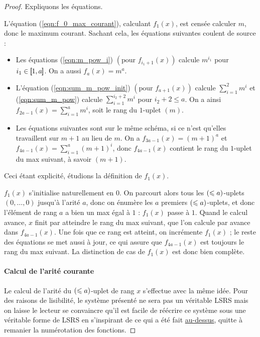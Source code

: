 \begin{proof}
			
			Expliquons les équations.
			
			L'équation (\ref{eqn:f_0_max_courant}), calculant $f_1(x)$, est censée calculer $m$, donc le maximum courant. Sachant cela, les équations suivantes coulent de source : 
			
			\begin{itemize}
				\item 	Les équations (\ref{eqn:m_pow_i}) $\left(\text{pour } f_{i_1 + 1}(x)\right)$ calcule $m^{i_1}$ pour $i_1 \in \left[\,\!\!\!\left[ 1 , a \right]\,\!\!\!\right]$. On a aussi $f_{a}(x) = m^a$. 
				
				\item 	L'équation (\ref{eqn:sum_m_pow_init}) $\left(\text{pour } f_{a + 1}(x)\right)$ calcule $\sum_{i = 1}^{2} m^i$ et (\ref{eqn:sum_m_pow}) calcule $\sum_{i = 1}^{i_2+2} m^i$ pour $i_2+2 \leqslant a$. On a ainsi $f_{2a-1}(x) = \sum_{i = 1}^{a} m^i$, soit le rang du $1$-uplet $(m)$.
				
				\item 	Les équations suivantes sont sur le même schéma, si ce n'est qu'elles travaillent sur $m+1$ au lieu de $m$. On a $f_{3a-1}(x) = (m+1)^a$ et $f_{4a-1}(x) = \sum_{i = 1}^{a} (m+1)^i$, donc $f_{4a-1}(x)$ contient le rang du $1$-uplet du max suivant, à savoir $(m+1)$. 
			\end{itemize}
			
			Ceci étant explicité, étudions la définition de $f_1(x)$. 
			
			$f_1(x)$ s'initialise naturellement en $0$. On parcourt alors tous les $\left( \leqslant a \right)$-uplets $(0, \dots, 0)$ jusqu'à l'arité $a$, donc on énumère les $a$ premiers $\left( \leqslant a \right)$-uplets, et donc l'élément de rang $a$ a bien un max égal à $1$ : $f_1(x)$ passe à $1$. Quand le calcul avance, $x$ finit par atteindre le rang du max suivant, que l'on calcule par avance dans $f_{4a-1}(x)$. Une fois que ce rang est atteint, on incrémente $f_1(x)$ ; le reste des équations se met aussi à jour, ce qui assure que $f_{4a-1}(x)$ est toujours le rang du max suivant. La distinction de cas de $f_1(x)$ est donc bien complète.
			
		\paragraph{Calcul de l'arité courante}
			\label{par:calcul_arite_courante}
			Le calcul de l'arité du $\left( \leqslant a \right)$-uplet de rang $x$ s'effectue avec la même idée. Pour des raisons de lisibilité, le système présenté ne sera pas un véritable LSRS mais on laisse le lecteur se convaincre qu'il est facile de réécrire ce système sous une véritable forme de LSRS en s'inspirant de ce qui a été fait \hyperref[par:calcul_max_bon_ordre]{au-dessus}, quitte à remanier la numérotation des fonctions. 
			

\end{proof}

